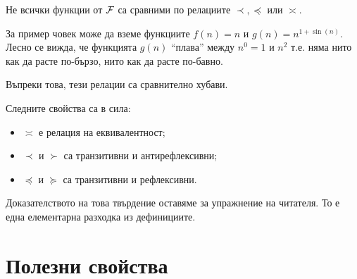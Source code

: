 \begin{warning}
  Не всички функции от $\mathcal{F}$ са сравними по релациите $\prec, \preceq$ или $\asymp$.

  За пример човек може да вземе функциите $f(n) = n$ и $g(n) = n^{1 + \sin(n)}$.
  Лесно се вижда, че функцията $g(n)$ ``плава'' между $n^0 = 1$ и $n^2$ т.е. няма нито как да расте по-бързо, нито как да расте по-бавно.
\end{warning}

Въпреки това, тези релации са сравнително хубави.
\begin{claim}
  Следните свойства са в сила:
  \begin{itemize}
    \item $\asymp$ е релация на еквивалентност;
    \item $\prec$ и $\succ$ са транзитивни и антирефлексивни;
    \item $\preceq$ и $\succeq$ са транзитивни и рефлексивни.
  \end{itemize}
\end{claim}

Доказателството на това твърдение оставяме за упражнение на читателя.
То е една елементарна разходка из дефинициите.

\newpage

\section{Полезни свойства}

